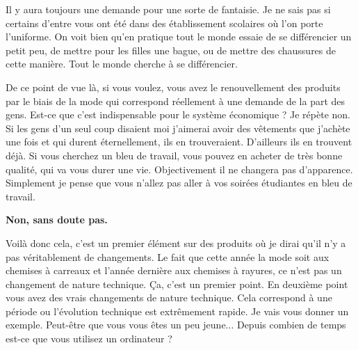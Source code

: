 \begin{small}
Il y aura toujours une demande pour une sorte de fantaisie. Je ne sais pas si certains d'entre vous ont été dans des établissement scolaires où l'on porte l'uniforme. On voit bien  qu'en pratique tout le monde essaie de se différencier un petit peu, de mettre pour les filles une bague, ou de mettre des chaussures de cette manière. Tout le monde cherche à se différencier. 

De ce point de vue là, si vous voulez, vous avez le renouvellement des produits par le biais de la mode qui correspond réellement à une demande de la part des gens. Est-ce que c'est indispensable pour le système économique ? Je répète non. Si les gens d'un seul coup disaient \og   moi j'aimerai avoir des vêtements que j’achète une fois et qui durent éternellement\fg{}, ils en trouveraient. D'ailleurs ils en trouvent déjà. Si vous cherchez un bleu de travail, vous pouvez en acheter de très bonne qualité,  qui va vous durer une vie. Objectivement il ne changera pas d'apparence. Simplement je pense que vous n'allez pas aller à vos soirées étudiantes en bleu de travail.

\smallbreak\textbf{Non, sans doute pas.}\smallbreak


Voilà donc  cela,  c'est un premier élément sur des produits où je dirai qu'il n'y a pas véritablement de changements. Le fait que cette année la mode soit aux chemises à carreaux et l'année dernière aux chemises à rayures, ce n'est pas un changement de nature technique. Ça, c'est un premier point.  En deuxième point vous avez des vrais changements de nature technique. Cela correspond à une période ou l'évolution technique est extrêmement rapide. Je vais vous donner un exemple. Peut-être que vous vous êtes un peu jeune... Depuis combien de temps est-ce que vous utilisez un ordinateur ?


\end{small}
